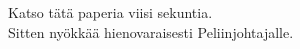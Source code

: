 \documentclass{article}
\begin{document}
\begin{infobox}
Katso tätä paperia viisi sekuntia. \\
Sitten nyökkää hienovaraisesti Peliinjohtajalle.
\end{infobox}
\end{document}
